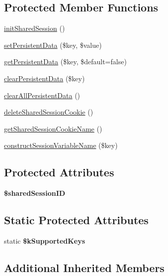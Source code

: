 \subsection*{Protected Member Functions}
\begin{DoxyCompactItemize}
\item 
\hyperlink{class_facebook_a45092100565c495946ec0d084d6a0e6f}{init\-Shared\-Session} ()
\item 
\hyperlink{class_facebook_a7c395efe8594a2afd06b462e8858fee8}{set\-Persistent\-Data} (\$key, \$value)
\item 
\hyperlink{class_facebook_a2d31791ed8c3a7d09a4338aec8749a7d}{get\-Persistent\-Data} (\$key, \$default=false)
\item 
\hyperlink{class_facebook_afff378a3ec897db92a642279b5b4b738}{clear\-Persistent\-Data} (\$key)
\item 
\hyperlink{class_facebook_ad0f8fc371cee2e8a6aaf5972bd5e7d6a}{clear\-All\-Persistent\-Data} ()
\item 
\hyperlink{class_facebook_a4a2808cefa4c3f7fed46cabc4a4b294a}{delete\-Shared\-Session\-Cookie} ()
\item 
\hyperlink{class_facebook_a248f7c8001c8e14326ea2ff62b75a439}{get\-Shared\-Session\-Cookie\-Name} ()
\item 
\hyperlink{class_facebook_af9e3b7391e3d39bc883c0d8c9d938853}{construct\-Session\-Variable\-Name} (\$key)
\end{DoxyCompactItemize}
\subsection*{Protected Attributes}
\begin{DoxyCompactItemize}
\item 
\hypertarget{class_facebook_a597d3b991bc633758b440bf7f04265e8}{{\bfseries \$shared\-Session\-I\-D}}\label{class_facebook_a597d3b991bc633758b440bf7f04265e8}

\end{DoxyCompactItemize}
\subsection*{Static Protected Attributes}
\begin{DoxyCompactItemize}
\item 
static {\bfseries \$k\-Supported\-Keys}
\end{DoxyCompactItemize}
\subsection*{Additional Inherited Members}


